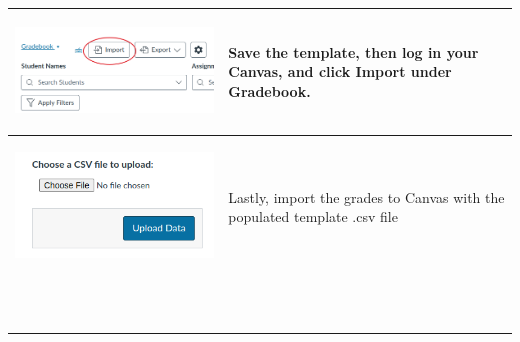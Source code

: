 \documentclass{article}
\begin{document}
{\begin{longtable}{|l|l|}
\hline
\begin{parbox}{0.45\textwidth}{\includegraphics[width=.45\textwidth]{gradebookImport.png} }
\end{parbox}&\begin{parbox}{0.45\textwidth}{Save the template, then log in your Canvas, and click Import under Gradebook.}
\end{parbox}\\
\hline
\begin{parbox}{0.45\textwidth}{\includegraphics[width=.45\textwidth]{chooseScoreCSV.png} }
\end{parbox}&\begin{parbox}{0.45\textwidth}{Lastly, import the grades to Canvas with the populated template .csv file}
\end{parbox}\\
\hline
\begin{parbox}{0.45\textwidth}{\ }
\end{parbox}&\begin{parbox}{0.45\textwidth}{}
\end{parbox}\\
\hline
\end{longtable}
} 
\end{document}
